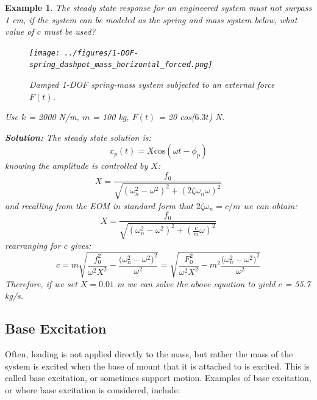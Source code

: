 \documentclass[12pt,letter]{article}
\newtheorem{ex}{Example}
\numberwithin{ex}{section} %
\newenvironment{example}{\begin{mdframed}[middlelinewidth=0.5mm]\begin{ex}\normalfont}{\end{ex}\end{mdframed}}
\numberwithin{re}{section} %
\numberwithin{pr}{section} %
\begin{document}
\begin{example}

		

			The steady state response for an engineered system must not surpass 1 cm, if the system can be modeled as the spring and mass system below, what value of $c$ must be used?  
			\begin{figure}[H]
				\centering
				\texttt{[image: ../figures/1-DOF-spring\_dashpot\_mass\_horizontal\_forced.png]}
				\caption{Damped 1-DOF spring-mass system subjected to an external force $F(t)$.}
			\end{figure}	
			\noindent Use $k$ = 2000 N/m, $m$ = 100 kg, $F(t)$ = 20 cos($6.3t$) N. 			

			\noindent\textbf{Solution:} The steady state solution is:
			\begin{equation}
				x_p(t) = X \text{cos}(\omega t - \phi_p)
			\end{equation}			 
			knowing the amplitude is controlled by $X$: 
			\begin{equation}
				X = \frac{f_0}{\sqrt{(\omega_n^2 - \omega^2)^2 +  (2\zeta \omega_n \omega)^2}} 
			\end{equation}	
			and recalling from the EOM in standard form that $2\zeta \omega_n = c/m$ we can obtain:
			\begin{equation}
				X = \frac{f_0}{\sqrt{(\omega_n^2 - \omega^2)^2 +  (\frac{c}{m} \omega)^2}} 
			\end{equation}		
			rearranging for $c$ gives:		
			\begin{equation}
				c = m\sqrt{\frac{f_0^2}{\omega^2 X^2}-\frac{\big(\omega_n^2-\omega^2\big)^2}{\omega^2}} = \sqrt{\frac{F_0^2}{\omega^2 X^2}-m^2\frac{\big(\omega_n^2-\omega^2\big)^2}{\omega^2}} 
			\end{equation}
			Therefore, if we set $X=0.01$ m we can solve the above equation to yield $c$ = 55.7 kg/s.
			
\end{example}	


	
		\subsection{Base Excitation}

			Often, loading is not applied directly to the mass, but rather the mass of the system is excited when the base of mount that it is attached to is excited. This is called base excitation, or sometimes support motion. Examples of base excitation, or where base excitation is considered, include:
			
\end{document}
